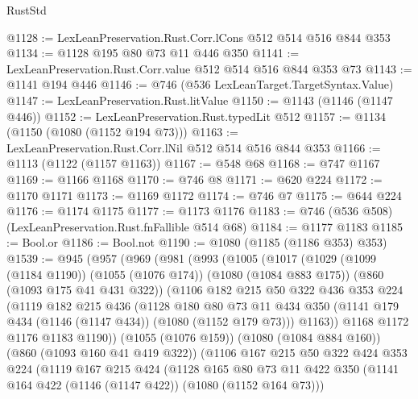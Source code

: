 \begin{lexlean}{RustStd}
\begin{coremodule}
@1128 := LexLeanPreservation.Rust.Corr.lCons @512 @514 @516 @844 @353
@1134 := @1128 @195 @80 @73 @11 @446 @350
@1141 := LexLeanPreservation.Rust.Corr.value @512 @514 @516 @844 @353 @73
@1143 := @1141 @194 @446
@1146 := @746 (@536 LexLeanTarget.TargetSyntax.Value)
@1147 := LexLeanPreservation.Rust.litValue
@1150 := @1143 (@1146 (@1147 @446))
@1152 := LexLeanPreservation.Rust.typedLit @512
@1157 := @1134 (@1150 (@1080 (@1152 @194 @73)))
@1163 := LexLeanPreservation.Rust.Corr.lNil @512 @514 @516 @844 @353
@1166 := @1113 (@1122 (@1157 @1163))
@1167 := @548 @68
@1168 := @747 @1167
@1169 := @1166 @1168
@1170 := @746 @8
@1171 := @620 @224
@1172 := @1170 @1171
@1173 := @1169 @1172
@1174 := @746 @7
@1175 := @644 @224
@1176 := @1174 @1175
@1177 := @1173 @1176
@1183 := @746 (@536 @508) (LexLeanPreservation.Rust.fnFallible @514 @68)
@1184 := @1177 @1183
@1185 := Bool.or
@1186 := Bool.not
@1190 := @1080 (@1185 (@1186 @353) @353)
@1539 := @945
    (@957
      (@969
        (@981
          (@993
            (@1005
              (@1017
                (@1029
                  (@1099 (@1184 @1190))
                  (@1055 (@1076 @174))
                  (@1080 (@1084 @883 @175))
                  (@860 (@1093 @175 @41 @431 @322))
                  (@1106
                    @182
                    @215
                    @50
                    @322
                    @436
                    @353
                    @224
                    (@1119
                      @182
                      @215
                      @436
                      (@1128
                        @180
                        @80
                        @73
                        @11
                        @434
                        @350
                        (@1141 @179 @434 (@1146 (@1147 @434)) (@1080 (@1152 @179 @73)))
                        @1163))
                    @1168
                    @1172
                    @1176
                    @1183
                    @1190))
                (@1055 (@1076 @159))
                (@1080 (@1084 @884 @160))
                (@860 (@1093 @160 @41 @419 @322))
                (@1106
                  @167
                  @215
                  @50
                  @322
                  @424
                  @353
                  @224
                  (@1119
                    @167
                    @215
                    @424
                    (@1128
                      @165
                      @80
                      @73
                      @11
                      @422
                      @350
                      (@1141 @164 @422 (@1146 (@1147 @422)) (@1080 (@1152 @164 @73)))

\end{coremodule}
\end{lexlean}
